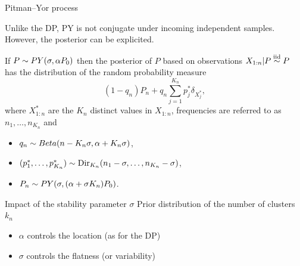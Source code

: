 \begin{frame}[allowframebreaks]{Pitman--Yor process}
\framebreak

Unlike the DP, PY is not conjugate under incoming independent samples. However, the posterior can be explicited.

\begin{theorem}
 If $P\sim PY(\sigma, \alpha P_0)$ then the posterior of $P$ based on observations $X_{1:n}|P\stackrel{\mbox{\scriptsize{iid}}}{\sim} P$ has the distribution of the random probability measure
\begin{equation*}
    (1-q_n)P_n + q_n \sum_{j=1}^{K_n}p_j^*\delta_{X_j^*},
\end{equation*}
where $X^*_{1:n}$ are the $K_n$ distinct values in $X_{1:n}$, frequencies are referred to as $n_1,\ldots,n_{K_n}$ and 
\begin{itemize}
    \item $q_n\sim Beta(n-K_n \sigma, \alpha +K_n\sigma)$,
    \item $(p_1^*, \ldots, p^*_{K_n})\sim \text{Dir}_{K_n}(n_1-\sigma, \ldots, n_{K_n} -\sigma)$,
    \item $P_n\sim PY(\sigma, (\alpha + \sigma K_n)P_0)$.
\end{itemize}
\end{theorem} 
\end{frame}

\begin{frame}{Impact of the stability parameter $\sigma$}
Prior distribution of the number of clusters $k_n$ 
\begin{itemize}
\item<1-> \textcolor<1>{red2}{$\alpha$ controls the location} (as for the DP)
\item<2-> \textcolor<2>{red2}{$\sigma$ controls the flatness (or variability)}
\end{itemize}
\begin{center}
\end{center}
\end{frame}


